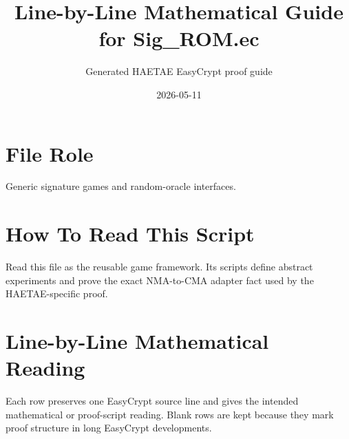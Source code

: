\documentclass[10pt]{article}
\title{Line-by-Line Mathematical Guide for Sig\_ROM.ec}
\author{Generated HAETAE EasyCrypt proof guide}
\date{2026-05-11}
\begin{document}
\maketitle

\section*{File Role}
Generic signature games and random-oracle interfaces.

\section*{How To Read This Script}
Read this file as the reusable game framework.  Its scripts define abstract experiments and prove the exact NMA-to-CMA adapter fact used by the HAETAE-specific proof.

\section*{Line-by-Line Mathematical Reading}
Each row preserves one EasyCrypt source line and gives the intended mathematical
or proof-script reading.  Blank rows are kept because they mark proof structure
in long EasyCrypt developments.
\end{document}
